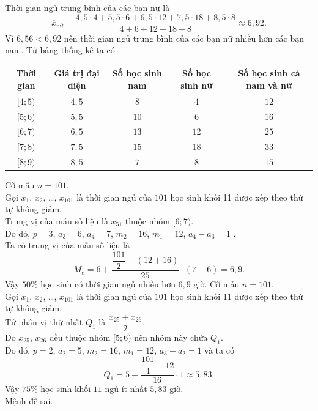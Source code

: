\begin{ex}
{\begin{itemchoice}
			Thời gian ngủ trung bình của các bạn nữ là 
			$$\overline{x}_{\text {nữ} }=\dfrac{4{,}5\cdot 4+5{,}5\cdot 6+6{,}5\cdot 12+7{,}5\cdot 18+8{,}5\cdot 8}{4+6+12+18+8}\approx 6{,}92.$$
			Vì $6{,}56<6{,}92$ nên thời gian ngủ trung bình của các bạn nữ nhiều hơn các bạn nam.
			\itemch 
			Từ bảng thống kê ta có
			\begin{center}
				\renewcommand{\arraystretch}{1.5}
				\begin{tabular}{|c|c|c|c|c|}
					\hline
					Thời gian & Giá trị đại diện & Số học sinh nam & Số học sinh nữ & Số học sinh cả nam và nữ \\
					\hline
					$[4;5)$ & $4{,}5$ & $8$ & $4$ & $12$\\
					\hline
					$[5;6)$ & $5{,}5$ & $10$ & $6$ & $16$\\
					\hline
					$[6;7)$ & $6{,}5$ & $13$ & $12$ & $25$\\
					\hline
					$[7;8)$ & $7{,}5$ & $15$ & $18$ & $33$\\
					\hline
					$[8;9)$ & $8{,}5$ & $7$ & $8$ & $15$\\
					\hline
				\end{tabular}
			\end{center}
			Cỡ mẫu $n=101$.\\
			Gọi $x_1$, $x_2$, \ldots, $x_{101}$ là thời gian ngủ của $101$ học sinh khối 11 được xếp theo thứ tự không giảm.\\
			Trung vị của mẫu số liệu là $x_{51}$ thuộc nhóm $[6;7)$.\\
			Do đó, $p=3$, $ a_{3}=6$, $ a_{4}=7$, $ m_{2}=16$, $m_{1}=12$, $ a_{4}-a_{3}=1$ .\\
			Ta có trung vị của mẫu số liệu là
			$$
			M_{e}=6+\dfrac{\dfrac{101}{2}-(12+16)}{25}\cdot(7-6)=6{,}9.
			$$
			Vậy $50$\% học sinh có thời gian ngủ nhiều hơn $6{,}9$ giờ.
			\itemch 
			Cỡ mẫu $n=101$.\\
			Gọi $x_1$, $x_2$, \ldots, $x_{101}$ là thời gian ngủ của $101$ học sinh khối 11 được xếp theo thứ tự không giảm.\\
			Tứ phân vị thứ nhất $Q_{1}$ là $\dfrac{x_{25}+x_{26}}{2}$.\\
			Do $x_{25}$, $x_{26}$ đều thuộc nhóm $[5;6)$ nên nhóm này chứa $Q_{1}$.\\
			Do đó, $p=2$, $ a_{2}=5$, $ m_{2}=16$, $ m_{1}=12$, $ a_{3}-a_{2}=1$ và ta có\\
			$$Q_{1}=5+\dfrac{\dfrac{101}{4}-12}{16}\cdot 1\approx 5{,}83.$$
			Vậy $75\%$ học sinh khối $11$ ngủ ít nhất $5{,}83$ giờ.\\
			Mệnh đề sai.
		\end{itemchoice}
	}
\end{ex}

